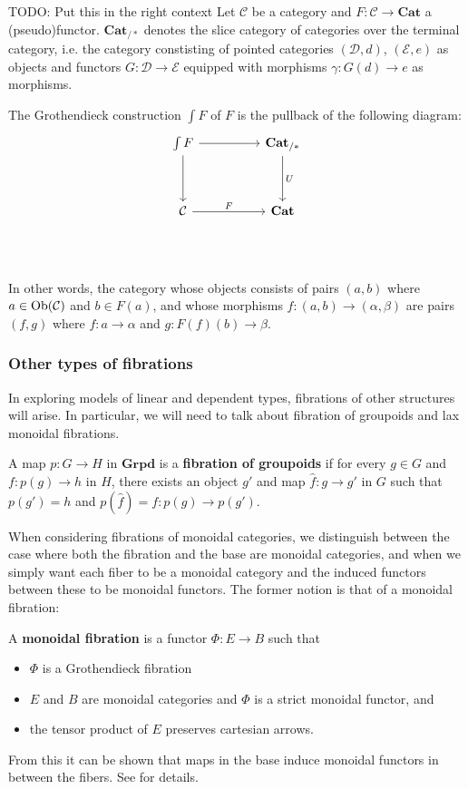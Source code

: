 TODO: Put this in the right context
Let $\mathcal{C}$ be a category and $F : \mathcal{C} \to \mathbf{Cat}$ a (pseudo)functor. $\textbf{Cat}_{/*}$ denotes the slice category of categories over the terminal category, i.e. the category constisting of pointed categories $(\mathcal{D}, d)$, $(\mathcal{E}, e)$ as objects and functors $G : \mathcal{D} \to \mathcal{E}$ equipped with morphisms $\gamma : G(d) \to e$ as morphisms.
\begin{defn}
The Grothendieck construction $\int F$ of $F$ is the pullback of the following diagram:
\[
\ti
\int F \ar[r] \ar[d] & \textbf{Cat}_{/*} \ar[d, "U"] \\
\mathcal{C} \ar[r, "F"] & \textbf{Cat} \\
\kz
\]
\end{defn}
In other words, the category whose objects consists of pairs $(a, b)$ where $a \in \operatorname{\text{Ob}}(\mathcal{C})$ and $b \in F(a)$, and whose morphisms $f : (a, b) \to (\alpha, \beta)$ are pairs $(f, g)$ where $f: a \to \alpha$ and $g : F(f)(b) \to \beta$.

\subsubsection{Other types of fibrations}
In exploring models of linear and dependent types, fibrations of other structures will arise. In particular, we will need to talk about fibration of groupoids and lax monoidal fibrations.
\begin{defn}
A map $p : G \to H$ in $\textbf{Grpd}$ is a \textbf{fibration of groupoids} if for every $g \in G$
and $f : p(g) \to h$ in $H$, there exists an object $g'$ and map $\hat f : g \to g'$ in $G$ such that $p(g') = h$ and $p(\hat f) = f : p(g) \to p(g')$.
\end{defn}
When considering fibrations of monoidal categories, we distinguish between the case where both the fibration and the base are monoidal categories, and when we simply want each fiber to be a monoidal category and the induced functors between these to be monoidal functors. The former notion is that of a monoidal fibration:
\begin{defn}
A \textbf{monoidal fibration} is a functor $\Phi\colon E\to B$ such that
\begin{itemize}
\item $\Phi$ is a Grothendieck fibration
\item $E$ and $B$ are monoidal categories and $\Phi$ is a strict monoidal functor, and
\item the tensor product of $E$ preserves cartesian arrows.
\end{itemize}
\end{defn}
From this it can be shown that maps in the base induce monoidal functors in between the fibers. See \cite{shulmanmonoidal} for details.


